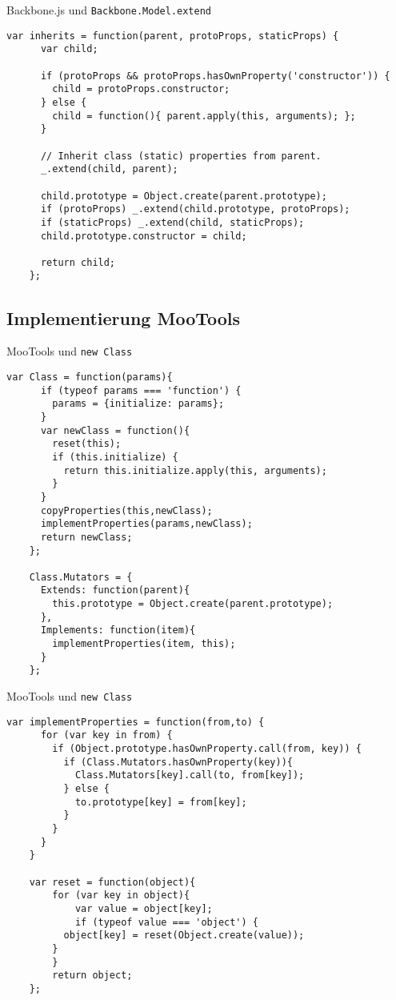 \begin{frame}[fragile]{Backbone.js und \texttt{Backbone.Model.extend}}
  \begin{lstlisting}[gobble=4]
    var inherits = function(parent, protoProps, staticProps) {
      var child;
    
      if (protoProps && protoProps.hasOwnProperty('constructor')) {
        child = protoProps.constructor;
      } else {
        child = function(){ parent.apply(this, arguments); };
      }
    
      // Inherit class (static) properties from parent.
      _.extend(child, parent);
    
      child.prototype = Object.create(parent.prototype);
      if (protoProps) _.extend(child.prototype, protoProps);
      if (staticProps) _.extend(child, staticProps);
      child.prototype.constructor = child;
    
      return child;
    };
  \end{lstlisting}
\end{frame}

\subsection{Implementierung MooTools}

\begin{frame}[fragile]{MooTools und \texttt{new Class}}
  \begin{lstlisting}[gobble=4]
    var Class = function(params){
      if (typeof params === 'function') {
        params = {initialize: params};
      }
      var newClass = function(){
        reset(this);
        if (this.initialize) {
          return this.initialize.apply(this, arguments);
        }
      }
      copyProperties(this,newClass);
      implementProperties(params,newClass);
      return newClass;
    };
    
    Class.Mutators = {
      Extends: function(parent){
        this.prototype = Object.create(parent.prototype);
      },
      Implements: function(item){
        implementProperties(item, this);
      }
    };
  \end{lstlisting}
\end{frame}

\begin{frame}[fragile]{MooTools und \texttt{new Class}}
  \begin{lstlisting}[gobble=4]
    var implementProperties = function(from,to) {
      for (var key in from) {
        if (Object.prototype.hasOwnProperty.call(from, key)) {
          if (Class.Mutators.hasOwnProperty(key)){
            Class.Mutators[key].call(to, from[key]);
          } else {
            to.prototype[key] = from[key];
          }
        }
      }
    }
    
    var reset = function(object){
    	for (var key in object){
    		var value = object[key]; 
    		if (typeof value === 'object') {
          object[key] = reset(Object.create(value));
        }
    	}
    	return object;
    };
  \end{lstlisting}
\end{frame}

